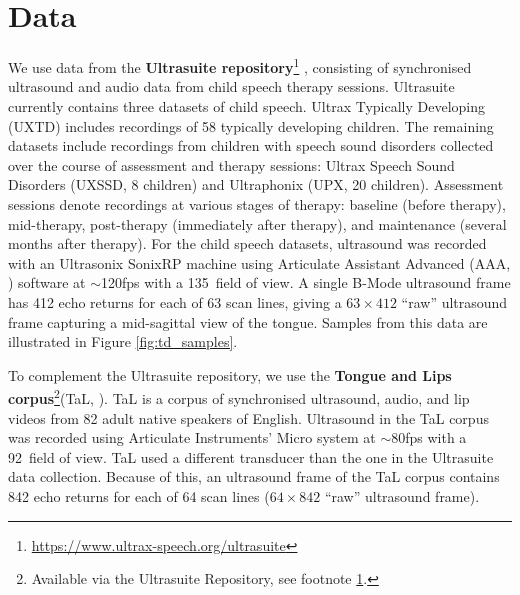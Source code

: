 \section{Data}
\label{sec:data}

We use data from the \textbf{Ultrasuite repository}\footnote{\label{fn:ultrasuite}\url{https://www.ultrax-speech.org/ultrasuite}} \citep{eshky2018ultrasuite}, consisting of synchronised ultrasound and audio data from child speech therapy sessions.
Ultrasuite currently contains three datasets of child speech.
Ultrax Typically Developing (UXTD) includes recordings of 58 typically developing children.
The remaining datasets include recordings from children with speech sound disorders collected over the course of assessment and therapy sessions: Ultrax Speech Sound Disorders  (UXSSD,  8  children)  and  Ultraphonix  (UPX,  20  children). 
Assessment sessions denote recordings at various stages of therapy: baseline (before therapy),  mid-therapy,  post-therapy  (immediately after therapy), and maintenance (several months after therapy).
For the child speech datasets, ultrasound was recorded with an Ultrasonix SonixRP machine using Articulate Assistant Advanced (AAA, \cite{articulate2010articulate}) software at $\sim$120fps with a 135\degree ~field of view.
A single B-Mode ultrasound frame has 412 echo returns for each of 63 scan lines, giving a $63\times412$ \enquote{raw} ultrasound frame capturing a mid-sagittal view of the tongue.
Samples from this data are illustrated in Figure \ref{fig:td_samples}.

To complement the Ultrasuite repository, we use the \textbf{Tongue and Lips corpus}\footnote{Available via the Ultrasuite Repository, see footnote \ref{fn:ultrasuite}.}(TaL, \cite{ribeiro2021tal}).
TaL is a corpus of synchronised ultrasound, audio, and lip videos from 82 adult native speakers of English.
Ultrasound in the TaL corpus was recorded using Articulate Instruments' Micro system \citep{articulate2010articulate} at $\sim$80fps with a 92\degree ~field of view.
TaL used a different transducer than the one in the Ultrasuite data collection.
Because of this, an ultrasound frame of the TaL corpus contains  842  echo  returns  for  each  of  64  scan  lines ($64\times842$ \enquote{raw} ultrasound frame).
